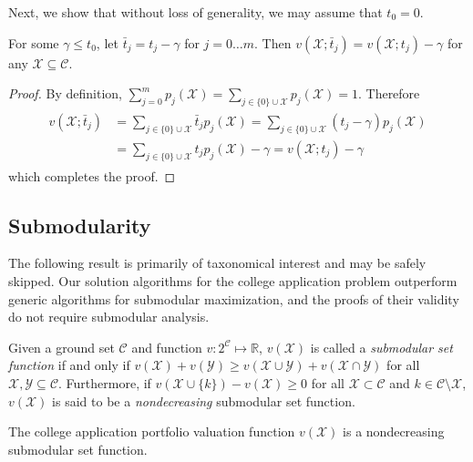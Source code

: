 Next, we show that without loss of generality, we may assume that $t_0 = 0$.

\begin{lemma} \label{assumetzerozero}
For some $\gamma \leq t_0$, let $\bar t_j = t_j - \gamma$ for $j = 0 \dots m$. Then $v(\mathcal{X}; \bar t_j) = v(\mathcal{X};  t_j) -  \gamma$ for any $\mathcal{X} \subseteq \mathcal{C}$. 
\end{lemma}
\begin{proof}
By definition, $\sum_{j=0}^m p_j(\mathcal{X}) = \sum_{j \in \{0\}\cup\mathcal{X}} p_j(\mathcal{X}) = 1$. Therefore
\begin{align}
\begin{split}
v(\mathcal{X}; \bar t_j) &= \sum_{j\in \{0\}\cup\mathcal{X}}  \bar t_j p_j(\mathcal{X})
=\sum_{j\in \{0\}\cup\mathcal{X}} (t_j - \gamma) p_j(\mathcal{X}) \\
&=\sum_{j\in \{0\}\cup\mathcal{X}} t_j p_j(\mathcal{X})  - \gamma 
= v(\mathcal{X}; t_j) - \gamma
\end{split} 
\end{align}
which completes the proof.
\end{proof}


\subsection{Submodularity}

The following result is primarily of taxonomical interest and may be safely skipped. Our solution algorithms for the college application problem outperform generic algorithms for submodular maximization, and the proofs of their validity do not require submodular analysis.

\begin{definition}
Given a ground set $\mathcal{C}$ and function $v : 2^{\mathcal{C}} \mapsto \mathbb{R}$, $v(\mathcal{X})$ is called a \emph{submodular set function} if and only if $v(\mathcal{X}) + v(\mathcal{Y}) \geq v(\mathcal{X}\cup\mathcal{Y}) + v(\mathcal{X}\cap\mathcal{Y})$
for all $\mathcal{X}, \mathcal{Y} \subseteq \mathcal{C}$. Furthermore, if $ v(\mathcal{X}\cup\{k\}) - v(\mathcal{X}) \geq 0$ for all $\mathcal{X} \subset \mathcal{C}$ and $k \in \mathcal{C} \setminus \mathcal{X}$, $v(\mathcal{X})$ is said to be a \emph{nondecreasing} submodular set function.
\end{definition}

\begin{theorem}
The college application portfolio valuation function
$v(\mathcal{X})$ %
is a nondecreasing submodular set function.
\end{theorem}


